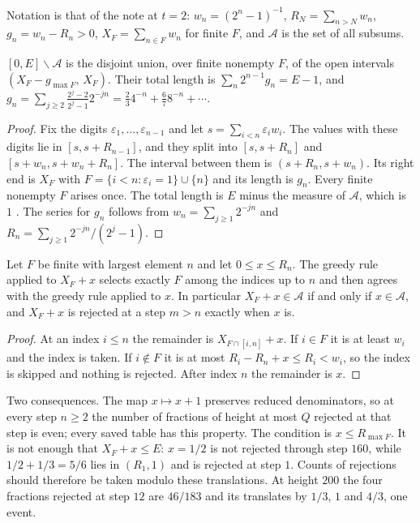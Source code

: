 \documentclass[11pt]{article}
\begin{document}
Notation is that of the note at $t=2$: $w_n=(2^n-1)^{-1}$,
$R_N=\sum_{n>N}w_n$, $g_n=w_n-R_n>0$, $X_F=\sum_{n\in F}w_n$ for finite $F$,
and $\mathcal A$ is the set of all subsums.

\begin{lemma}\label{lem:gaps}
$[0,E]\smallsetminus\mathcal A$ is the disjoint union, over finite nonempty $F$, of
the open intervals $(X_F-g_{\max F},\,X_F)$.  Their total length is
$\sum_n2^{n-1}g_n=E-1$, and
$g_n=\sum_{j\ge2}\frac{2^j-2}{2^j-1}2^{-jn}=\tfrac23 4^{-n}+\tfrac67 8^{-n}+\cdots$.
\end{lemma}

\begin{proof}
Fix the digits $\varepsilon_1,\dots,\varepsilon_{n-1}$ and let
$s=\sum_{i<n}\varepsilon_iw_i$.
The values with these digits lie in $[s,s+R_{n-1}]$, and they split into
$[s,s+R_n]$ and $[s+w_n,s+w_n+R_n]$.  The interval between them is
$(s+R_n,s+w_n)$.  Its right end is $X_F$ with
$F=\{i<n:\varepsilon_i=1\}\cup\{n\}$ and its length is $g_n$.  Every finite
nonempty $F$ arises once.  The total length is $E$ minus the measure of
$\mathcal A$, which is $1$ \cite[Section~7]{plectis257}.  The series for $g_n$
follows from $w_n=\sum_{j\ge1}2^{-jn}$ and
$R_n=\sum_{j\ge1}2^{-jn}/(2^j-1)$.
\end{proof}

\begin{lemma}\label{lem:translate}
Let $F$ be finite with largest element $n$ and let $0\le x\le R_n$.  The greedy
rule applied to $X_F+x$ selects exactly $F$ among the indices up to $n$ and then
agrees with the greedy rule applied to $x$.  In particular $X_F+x\in\mathcal A$
if and only if $x\in\mathcal A$, and $X_F+x$ is rejected at a step $m>n$ exactly
when $x$ is.
\end{lemma}

\begin{proof}
At an index $i\le n$ the remainder is $X_{F\cap[i,n]}+x$.  If $i\in F$ it is at
least $w_i$ and the index is taken.  If $i\notin F$ it is at most
$R_i-R_n+x\le R_i<w_i$, so the index is skipped and nothing is rejected.  After
index $n$ the remainder is $x$.
\end{proof}

Two consequences.  The map $x\mapsto x+1$ preserves reduced denominators, so at
every step $n\ge2$ the number of fractions of height at most $Q$ rejected at
that step is even; every saved table has this property.  The condition is
$x\le R_{\max F}$.  It is not enough that $X_F+x\le E$: $x=1/2$ is not rejected
through step $160$, while $1/2+1/3=5/6$ lies in $(R_1,1)$ and is rejected at
step $1$.  Counts of rejections should therefore be taken modulo these
translations.  At height $200$ the four fractions rejected at step $12$ are
$46/183$ and its translates by $1/3$, $1$ and $4/3$, one event.
\end{document}
